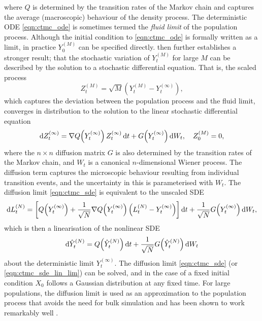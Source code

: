 where \(Q\) is determined by the transition rates of the Markov chain and captures the average (macroscopic) behaviour of the density process.
The deterministic ODE \cref{eqn:ctmc_ode} is sometimes termed the \emph{fluid limit} of the population process.
Although the initial condition to \cref{eqn:ctmc_ode} is formally written as a limit, in practice \(Y_0^{(M)}\) can be specified directly.
\citet{Kurtz_1971_LimitTheoremsSequences} then further establishes a stronger result; that the stochastic variation of \(Y_t^{(M)}\) for large \(M\) can be described by the solution to a stochastic differential equation.
That is, the scaled process
\[
	Z_t^{(M)} = \sqrt{M}\left(Y_t^{(M)} - Y_t^{(\infty)}\right),
\]
which captures the deviation between the population process and the fluid limit, converges in distribution to the solution to the linear stochastic differential equation \citep{Kurtz_1971_LimitTheoremsSequences}
\begin{equation}
	\dif Z_t^{(\infty)} = \nabla Q\!\left(Y_t^{(\infty)}\right) Z_t^{(\infty)}\dif t + G\!\left(Y_t^{(\infty)}\right)\dif W_t, \quad Z_0^{(M)} = 0,
	\label{eqn:ctmc_sde}
\end{equation}
where the \(n\times n\) diffusion matrix \(G\) is also determined by the transition rates of the Markov chain, and \(W_t\) is a canonical \(n\)-dimensional Wiener process.
The diffusion term captures the microscopic behaviour resulting from individual transition events, and the uncertainty in this is parameterised with \(W_t\).
The diffusion limit \cref{eqn:ctmc_sde} is equivalent to the unscaled SDE
\begin{equation}
	\dif L_t^{(N)} = \left[Q\!\left(Y_t^{(\infty)}\right) + \frac{1}{\sqrt{N}} \nabla Q\!\left(Y_t^{(\infty)}\right)\left(L_t^{(N)} - Y_t^{(\infty)}\right)\right]\dif t + \frac{1}{\sqrt{N}}G\!\left(Y_t^{(\infty)}\right)\dif W_t,
	\label{eqn:ctmc_sde_lin_lim}
\end{equation}
which is then a linearisation of the nonlinear SDE
\begin{equation}
	\dif \hat{Y}^{(N)}_t = Q\!\left(\hat{Y}^{(N)}_t\right)\dif t + \frac{1}{\sqrt{N}}G\!\left(\hat{Y}_t^{(N)}\right)\dif W_t
	\label{eqn:ctmc_sde_lim_nonlin}
\end{equation}
about the deterministic limit \(Y_t^{(\infty)}\).
The diffusion limit \cref{eqn:ctmc_sde} (or \cref{eqn:ctmc_sde_lin_lim}) can be solved, and in the case of a fixed initial condition \(X_0\) follows a Gaussian distribution at any fixed time.
For large populations, the diffusion limit is used as an approximation to the population process that avoids the need for bulk simulation and has been shown to work remarkably well \citep{PollettEtAl_2010_ModellingPopulationProcesses}.

